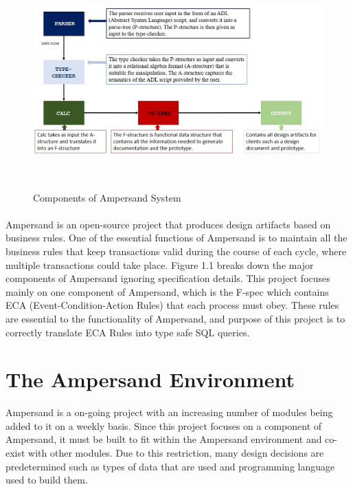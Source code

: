 \documentclass[12pt]{report}
\begin{document}
\begin{figure}[!htb]
\centering
\includegraphics[width=\textwidth]{../figures/ampersand_parts}
\caption{Components of Ampersand System}~\label{fig:AmpersandParts}
\end{figure}

\paragraph{}
Ampersand is an open-source project that produces design artifacts based on 
business rules. One of the essential functions of Ampersand is to maintain all 
the business rules that keep transactions valid during the course of each 
cycle, where multiple transactions could take place.  Figure 1.1  breaks 
down the major components of Ampersand ignoring specification details. 
This 
project focuses mainly on one component of Ampersand, which is the F-spec which 
contains ECA (Event-Condition-Action Rules) that each process must obey. These 
rules are essential 
to the functionality of Ampersand, and purpose of this 
project is to correctly translate ECA Rules into type safe SQL queries.
{\section{The Ampersand Environment}\label{sec:Purpose}}
Ampersand is a on-going project with an increasing number of modules being
added to it on a weekly basis. 
Since this project focuses on a component of 
Ampersand, it must be built to fit within the Ampersand environment and 
co-exist with other modules. Due to this restriction, many design decisions are 
predetermined such as types of data that are used and programming language used 
to build them.
\end{document}
